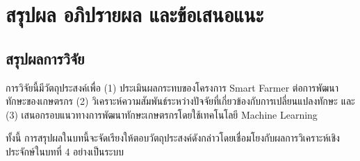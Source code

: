 \chapter{สรุปผล อภิปรายผล และข้อเสนอแนะ}

\section{สรุปผลการวิจัย}
การวิจัยนี้มีวัตถุประสงค์เพื่อ (1) ประเมินผลกระทบของโครงการ Smart Farmer ต่อการพัฒนาทักษะของเกษตรกร (2) วิเคราะห์ความสัมพันธ์ระหว่างปัจจัยที่เกี่ยวข้องกับการเปลี่ยนแปลงทักษะ และ (3) เสนอกรอบแนวทางการพัฒนาทักษะเกษตรกรโดยใช้เทคโนโลยี Machine Learning

ทั้งนี้ การสรุปผลในบทนี้จะจัดเรียงให้ตอบวัตถุประสงค์ดังกล่าวโดยเชื่อมโยงกับผลการวิเคราะห์เชิงประจักษ์ในบทที่ 4 อย่างเป็นระบบ

